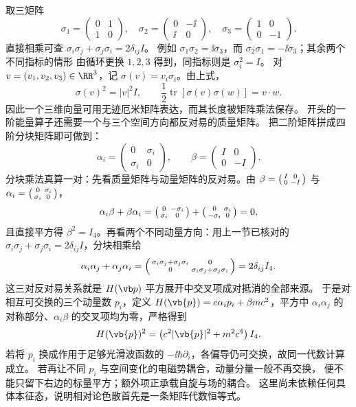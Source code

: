 取三矩阵
\[
\sigma_1=\begin{pmatrix}0&1\\1&0\end{pmatrix},\quad
\sigma_2=\begin{pmatrix}0&-\ii\\\ii&0\end{pmatrix},\quad
\sigma_3=\begin{pmatrix}1&0\\0&-1\end{pmatrix}.
\]
直接相乘可查
\(\sigma_i\sigma_j+\sigma_j\sigma_i=2\delta_{ij}I\)。
例如 \(\sigma_1\sigma_2=\ii\sigma_3\)，而
\(\sigma_2\sigma_1=-\ii\sigma_3\)；其余两个不同指标的情形
由循环更换 \(1,2,3\) 得到，同指标则是 \(\sigma_i^2=I\)。
对 \(v=(v_1,v_2,v_3)\in\RR^3\)，记
\(\sigma(v)=v_i\sigma_i\)。由上式，
\[
\sigma(v)^2=|v|^2I,\qquad
\frac12\operatorname{tr}[\sigma(v)\sigma(w)]=v\cdot w.
\]
因此一个三维向量可用无迹厄米矩阵表达，而其长度被矩阵乘法保存。
开头的一阶能量算子还需要一个与三个空间方向都反对易的质量矩阵。
把二阶矩阵拼成四阶分块矩阵即可做到：
\[
\alpha_i=\begin{pmatrix}0&\sigma_i\\\sigma_i&0\end{pmatrix},
\qquad
\beta=\begin{pmatrix}I&0\\0&-I\end{pmatrix}.
\]
分块乘法真算一对：先看质量矩阵与动量矩阵的反对易。由
\(\beta=\begin{psmallmatrix}I&0\\0&-I\end{psmallmatrix}\) 与
\(\alpha_i=\begin{psmallmatrix}0&\sigma_i\\\sigma_i&0\end{psmallmatrix}\)，
\[
\alpha_i\beta+\beta\alpha_i
=\begin{psmallmatrix}0&-\sigma_i\\ \sigma_i&0\end{psmallmatrix}
+\begin{psmallmatrix}0&\sigma_i\\ -\sigma_i&0\end{psmallmatrix}=0,
\]
且直接平方得 \(\beta^2=I_4\)。再看两个不同动量方向：用上一节已核对的
\(\sigma_i\sigma_j+\sigma_j\sigma_i=2\delta_{ij}I\)，分块相乘给
\[
\alpha_i\alpha_j+\alpha_j\alpha_i
=\begin{psmallmatrix}\sigma_i\sigma_j+\sigma_j\sigma_i&0\\
0&\sigma_i\sigma_j+\sigma_j\sigma_i\end{psmallmatrix}
=2\delta_{ij}I_4.
\]
这三对反对易关系就是 \(H(\vb p)\) 平方展开中交叉项成对抵消的全部来源。
于是对相互可交换的三个动量数 \(p_i\)，定义
\(H(\vb{p})=c\alpha_i p_i+\beta mc^2\)，平方中
\(\alpha_i\alpha_j\) 的对称部分、\(\alpha_i\beta\) 的交叉项均为零，严格得到
\[
H(\vb{p})^2=
\left(c^2|\vb{p}|^2+m^2c^4\right)I_4.
\]
若将 \(p_i\) 换成作用于足够光滑波函数的
\(-\ii\hbar\partial_i\)，各偏导仍可交换，故同一代数计算成立。
若再让不同 \(p_i\) 与空间变化的电磁势耦合，动量分量一般不再交换，
便不能只留下右边的标量平方；额外项正承载自旋与场的耦合。
这里尚未依赖任何具体本征态，说明相对论色散首先是一条矩阵代数恒等式。

